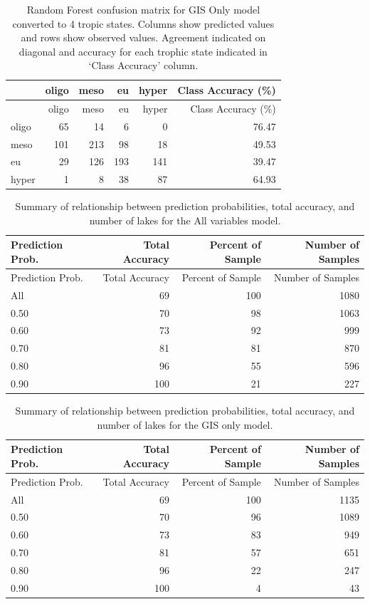 \documentclass[12pt,]{article}
\begin{document}
\newpage

\begin{longtable}[c]{@{}lrrrrr@{}}
\caption{Random Forest confusion matrix for GIS Only model converted to
4 tropic states. Columns show predicted values and rows show observed
values. Agreement indicated on diagonal and accuracy for each trophic
state indicated in `Class Accuracy' column.
\label{tab:Confusion_GIS_4}}\tabularnewline
\toprule
& oligo & meso & eu & hyper & Class Accuracy (\%)\tabularnewline
\midrule
\endfirsthead
\toprule
& oligo & meso & eu & hyper & Class Accuracy (\%)\tabularnewline
\midrule
\endhead
oligo & 65 & 14 & 6 & 0 & 76.47\tabularnewline
meso & 101 & 213 & 98 & 18 & 49.53\tabularnewline
eu & 29 & 126 & 193 & 141 & 39.47\tabularnewline
hyper & 1 & 8 & 38 & 87 & 64.93\tabularnewline
\bottomrule
\end{longtable}

\newpage

\begin{longtable}[c]{@{}lrrr@{}}
\caption{Summary of relationship between prediction probabilities, total
accuracy, and number of lakes for the All variables model.
\label{tab:cond_prob_tab_all}}\tabularnewline
\toprule
Prediction Prob. & Total Accuracy & Percent of Sample & Number of
Samples\tabularnewline
\midrule
\endfirsthead
\toprule
Prediction Prob. & Total Accuracy & Percent of Sample & Number of
Samples\tabularnewline
\midrule
\endhead
All & 69 & 100 & 1080\tabularnewline
0.50 & 70 & 98 & 1063\tabularnewline
0.60 & 73 & 92 & 999\tabularnewline
0.70 & 81 & 81 & 870\tabularnewline
0.80 & 96 & 55 & 596\tabularnewline
0.90 & 100 & 21 & 227\tabularnewline
\bottomrule
\end{longtable}

\newpage

\begin{longtable}[c]{@{}lrrr@{}}
\caption{Summary of relationship between prediction probabilities, total
accuracy, and number of lakes for the GIS only model.
\label{tab:cond_prob_tab_gis}}\tabularnewline
\toprule
Prediction Prob. & Total Accuracy & Percent of Sample & Number of
Samples\tabularnewline
\midrule
\endfirsthead
\toprule
Prediction Prob. & Total Accuracy & Percent of Sample & Number of
Samples\tabularnewline
\midrule
\endhead
All & 69 & 100 & 1135\tabularnewline
0.50 & 70 & 96 & 1089\tabularnewline
0.60 & 73 & 83 & 949\tabularnewline
0.70 & 81 & 57 & 651\tabularnewline
0.80 & 96 & 22 & 247\tabularnewline
0.90 & 100 & 4 & 43\tabularnewline
\bottomrule
\end{longtable}
\end{document}
